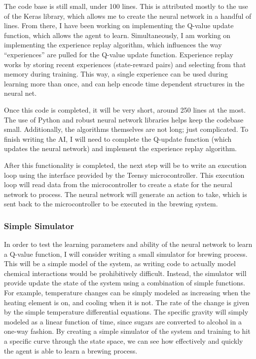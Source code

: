 \documentclass[draftclsnofoot,onecolumn,letterpaper,10pt]{IEEEtran}
\begin{document}
The code base is still small, under 100 lines.
This is attributed mostly to the use of the Keras library, which allows me to create the neural network in a handful of lines.
From there, I have been working on implementing the Q-value update function, which allows the agent to learn.
Simultaneously, I am working on implementing the experience replay algorithm, which influences the way ``experiences'' are pulled for the Q-value update function.
Experience replay works by storing recent experiences (state-reward pairs) and selecting from that memory during training.
This way, a single experience can be used during learning more than once, and can help encode time dependent structures in the neural net.

Once this code is completed, it will be very short, around 250 lines at the most. The use of Python and robust neural network libraries helps keep the codebase small. Additionally, the algorithms themselves are not long; just complicated.
To finish writing the AI, I will need to complete the Q-update function (which updates the neural network) and implement the experience replay algorithm.

After this functionality is completed, the next step will be to write an execution loop using the interface provided by the Teensy microcontroller.
This execution loop will read data from the microcontroller to create a state for the neural network to process.
The neural network will generate an action to take, which is sent back to the microcontroller to be executed in the brewing system.

\subsubsection{Simple Simulator}
In order to test the learning parameters and ability of the neural network to learn a Q-value function, I will consider writing a small simulator for brewing process.
This will be a simple model of the system, as writing code to actually model chemical interactions would be prohibitively difficult.
Instead, the simulator will provide update the state of the system using a combination of simple functions.
For example, temperature changes can be simply modeled as increasing when the heating element is on, and cooling when it is not.
The rate of the change is given by the simple temperature differential equations.
The specific gravity will simply modeled as a linear function of time, since sugars are converted to alcohol in a one-way fashion.
By creating a simple simulator of the system and training to hit a specific curve through the state space, we can see how effectively and quickly the agent is able to learn a brewing process.
\end{document}
